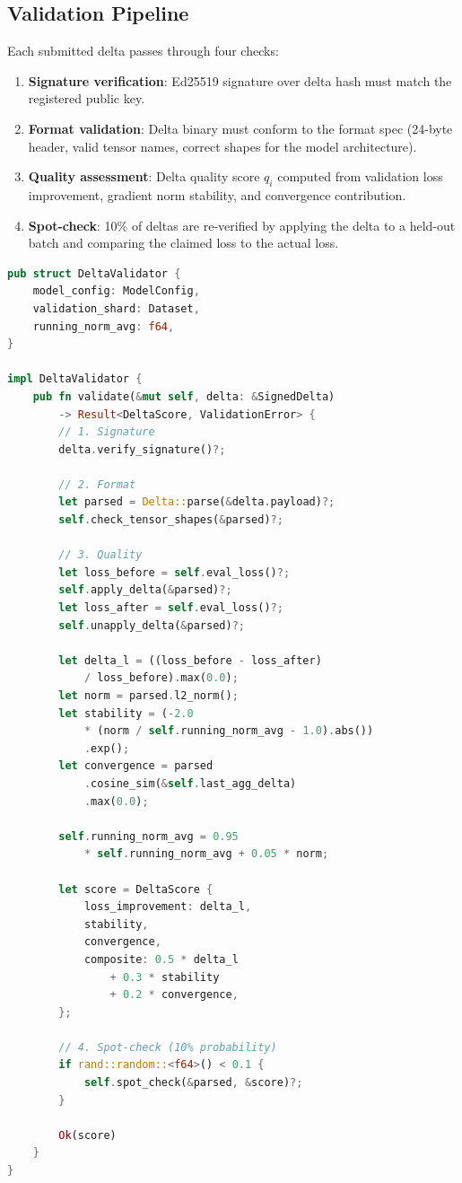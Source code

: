 \documentclass[11pt,letterpaper]{article}
\begin{document}
\subsection{Validation Pipeline}

Each submitted delta passes through four checks:

\begin{enumerate}
    \item \textbf{Signature verification}: Ed25519 signature over delta hash must match the registered public key.
    \item \textbf{Format validation}: Delta binary must conform to the format spec (24-byte header, valid tensor names, correct shapes for the model architecture).
    \item \textbf{Quality assessment}: Delta quality score $q_i$ computed from validation loss improvement, gradient norm stability, and convergence contribution.
    \item \textbf{Spot-check}: 10\% of deltas are re-verified by applying the delta to a held-out batch and comparing the claimed loss to the actual loss.
\end{enumerate}

\begin{lstlisting}[language=Rust,caption=Delta validation pipeline]
pub struct DeltaValidator {
    model_config: ModelConfig,
    validation_shard: Dataset,
    running_norm_avg: f64,
}

impl DeltaValidator {
    pub fn validate(&mut self, delta: &SignedDelta)
        -> Result<DeltaScore, ValidationError> {
        // 1. Signature
        delta.verify_signature()?;

        // 2. Format
        let parsed = Delta::parse(&delta.payload)?;
        self.check_tensor_shapes(&parsed)?;

        // 3. Quality
        let loss_before = self.eval_loss()?;
        self.apply_delta(&parsed)?;
        let loss_after = self.eval_loss()?;
        self.unapply_delta(&parsed)?;

        let delta_l = ((loss_before - loss_after)
            / loss_before).max(0.0);
        let norm = parsed.l2_norm();
        let stability = (-2.0
            * (norm / self.running_norm_avg - 1.0).abs())
            .exp();
        let convergence = parsed
            .cosine_sim(&self.last_agg_delta)
            .max(0.0);

        self.running_norm_avg = 0.95
            * self.running_norm_avg + 0.05 * norm;

        let score = DeltaScore {
            loss_improvement: delta_l,
            stability,
            convergence,
            composite: 0.5 * delta_l
                + 0.3 * stability
                + 0.2 * convergence,
        };

        // 4. Spot-check (10% probability)
        if rand::random::<f64>() < 0.1 {
            self.spot_check(&parsed, &score)?;
        }

        Ok(score)
    }
}
\end{lstlisting}
\end{document}
